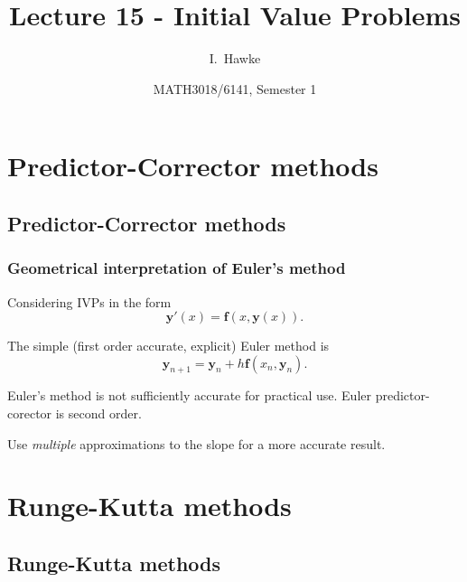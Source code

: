 \documentclass{beamer}
\title[Lecture 15] %
{Lecture 15 - Initial Value Problems}
\author[I. Hawke] %
{I.~Hawke}
\institute[University of Southampton] %
{
  School of Mathematics, \\
  University of Southampton, UK
}
\date[Semester 1] %
{MATH3018/6141, Semester 1}
\newcommand{\by}{{\boldsymbol{y}}}
\newcommand{\bfm}[1]{{\boldsymbol{#1}}}
\begin{document}
\begin{frame}
  \titlepage
\end{frame}

\section{Predictor-Corrector methods}

\subsection{Predictor-Corrector methods}

\begin{frame}
  \frametitle{Geometrical interpretation of Euler's method}

  Considering IVPs in the form
  \begin{equation*}
    \by'(x) = \bfm{f}(x, \by(x)).
  \end{equation*}

  The simple (first order accurate, explicit) Euler method is
  \begin{equation*}
    \by_{n+1} = \by_n + h \bfm{f}(x_n, \by_n).
  \end{equation*} \pause

  Euler's method is not sufficiently accurate for practical use. Euler predictor-corector is second order. \pause

  Use \emph{multiple} approximations to the slope for a more accurate result.

\end{frame}


\section{Runge-Kutta methods}

\subsection{Runge-Kutta methods}
\end{document}
